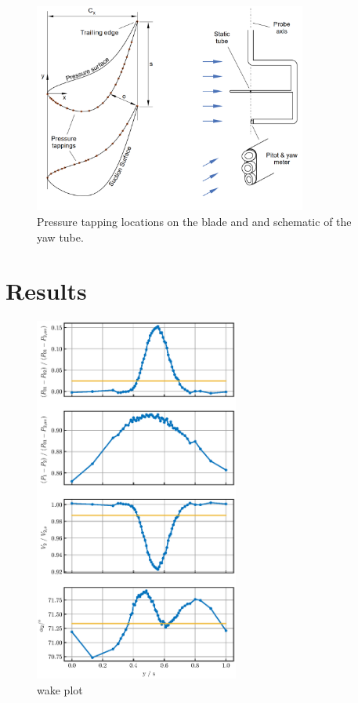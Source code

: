 \documentclass{article}
\begin{document}
\begin{figure}
    \centering
    \includegraphics[width=0.8\textwidth]{figures/tappings_and_yawtube.png}
    \caption{Pressure tapping locations on the blade and and schematic of the yaw tube.}
    \label{fig:setup}
\end{figure}

\section{Results}

\begin{figure}[H]
    \centering
    \includegraphics[width=0.6\textwidth]{figures/wake_plot.eps}
    \caption{wake plot}
    \label{fig:wake_plot}
\end{figure}
\end{document}
